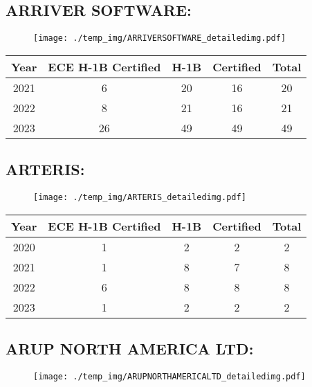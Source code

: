 \documentclass{article}%
\begin{document}
%
\newpage%
\subsection{ARRIVER SOFTWARE:}%
\label{subsec:ARRIVERSOFTWARE}%
\label{ARRIVERSOFTWAREdetailed}%


\begin{figure}[htbp]%
\centering%
\texttt{[image: ./temp\_img/ARRIVERSOFTWARE\_detailedimg.pdf]}%
\end{figure}

%
\begin{longtable}{c|c|c|c|c}%
\hline%
Year&ECE H{-}1B Certified&H{-}1B&Certified&Total\\%
\hline%
2021&6&20&16&20\\%
\hline%
2022&8&21&16&21\\%
\hline%
2023&26&49&49&49\\%
\hline%
\end{longtable}

%
\newpage%
\subsection{ARTERIS:}%
\label{subsec:ARTERIS}%
\label{ARTERISdetailed}%


\begin{figure}[htbp]%
\centering%
\texttt{[image: ./temp\_img/ARTERIS\_detailedimg.pdf]}%
\end{figure}

%
\begin{longtable}{c|c|c|c|c}%
\hline%
Year&ECE H{-}1B Certified&H{-}1B&Certified&Total\\%
\hline%
2020&1&2&2&2\\%
\hline%
2021&1&8&7&8\\%
\hline%
2022&6&8&8&8\\%
\hline%
2023&1&2&2&2\\%
\hline%
\end{longtable}

%
\newpage%
\subsection{ARUP NORTH AMERICA LTD:}%
\label{subsec:ARUPNORTHAMERICALTD}%
\label{ARUPNORTHAMERICALTDdetailed}%


\begin{figure}[htbp]%
\centering%
\texttt{[image: ./temp\_img/ARUPNORTHAMERICALTD\_detailedimg.pdf]}%
\end{figure}
\end{document}
